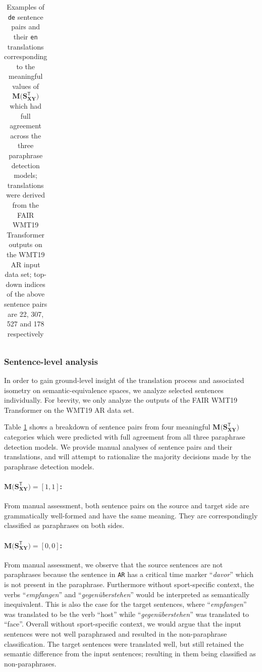 \documentclass[11pt,a4paper]{article}
\begin{document}
\begin{table}[t!]
\begin{tabular*}{\textwidth}{ll p{5.9cm} p{5.9cm}}
    \hline
  \end{tabular*}
  \caption{Examples of \texttt{de} sentence pairs and their \texttt{en} translations corresponding to the meaningful values of $\mathbf{M(S_{XY}^{\mathsf{T}}})$ which had full agreement across the three paraphrase detection models; translations were derived from the FAIR WMT19 Transformer outputs on the WMT19 AR input data set; top-down indices of the above sentence pairs are 22, 307, 527 and 178 respectively}
  \label{isometry_examples_sentences}
\end{table}

\subsubsection{Sentence-level analysis}

In order to gain ground-level insight of the translation process and associated isometry on semantic-equivalence spaces, we analyze selected sentences individually. For brevity, we only analyze the outputs of the FAIR WMT19 Transformer on the WMT19 AR data set.

Table \ref{isometry_examples_sentences} shows a breakdown of sentence pairs from four meaningful $\mathbf{M(S_{XY}^{\mathsf{T}}})$ categories which were predicted with full agreement from all three paraphrase detection models. We provide manual analyses of sentence pairs and their translations, and will attempt to rationalize the majority decisions made by the paraphrase detection models.

\paragraph{$\mathbf{M(S_{XY}^{\mathsf{T}}}) = [1,1]$:} From manual assessment, both sentence pairs on the source and target side are grammatically well-formed and have the same meaning. They are correspondingly classified as paraphrases on both sides.
\paragraph{$\mathbf{M(S_{XY}^{\mathsf{T}}}) = [0,0]$:} From manual assessment, we observe that the source sentences are not paraphrases because the sentence in \texttt{AR} has a critical time marker ``\textit{davor}'' which is not present in the paraphrase. Furthermore without sport-specific context, the verbs ``\textit{empfangen}'' and ``\textit{gegenüberstehen}'' would be interpreted as semantically inequivalent. This is also the case for the target sentences, where ``\textit{empfangen}'' was translated to be the verb ``host'' while ``\textit{gegenüberstehen}'' was translated to ``face''. Overall without sport-specific context, we would argue that the input sentences were not well paraphrased and resulted in the non-paraphrase classification. The target sentences were translated well, but still retained the semantic difference from the input sentences; resulting in them being classified as non-paraphrases.
\end{document}

